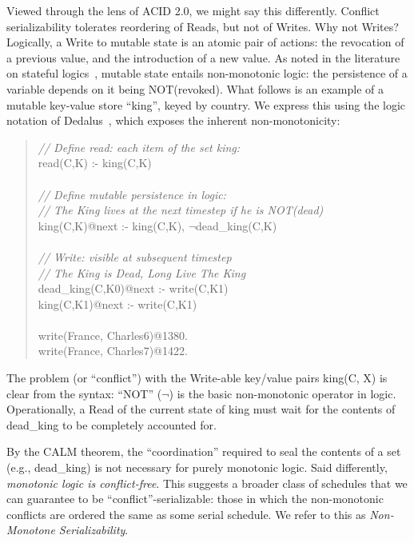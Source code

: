 \documentclass{sig-alternate}
\begin{document}
Viewed through the lens of ACID 2.0, we might say this differently.  Conflict serializability tolerates reordering of Reads, but not of Writes.  Why not Writes?  Logically, a Write to mutable state is an atomic pair of actions: the revocation of a previous value, and the introduction of a new value.   As noted in the literature on stateful logics~\cite{statelog,dedalus}, mutable state entails non-monotonic logic: the persistence of a variable depends on it being NOT(revoked).  What follows is an example of a mutable key-value store ``king'', keyed by country.  We express this using the logic notation of Dedalus~\cite{dedalus}, which exposes the inherent non-monotonicity:
\begin{quote}
	\emph{// Define read: each item of the set king: }\\
	read(C,K) :- king(C,K)\\
	\\
	\emph{// Define mutable persistence in logic:}\\
	\emph{// The King lives at the next timestep if he is NOT(dead)}\\
	king(C,K)@next :- king(C,K), $\neg$dead\_king(C,K)\\
	\\
	\emph{// Write: visible at subsequent timestep}\\
	\emph{// The King is Dead, Long Live The King}\\
	dead\_king(C,K0)@next :- write(C,K1)\\
	king(C,K1)@next :- write(C,K1)\\
	\\
	write(France, Charles6)@1380.\\
	write(France, Charles7)@1422.
\end{quote}
The problem (or ``conflict'') with the Write-able key/value pairs king(C, X) is clear from the syntax: ``NOT'' ($\neg$) is the basic non-monotonic operator in logic.  Operationally, a Read of the current state of king must wait for the contents of dead\_king to be completely accounted for.

By the CALM theorem, the ``coordination'' required to seal the contents of a set (e.g., dead\_king) is not necessary for purely monotonic logic.  Said differently, \emph{monotonic logic is conflict-free}.  This suggests a broader class of schedules that we can guarantee to be ``conflict''-serializable: those in which the non-monotonic conflicts are ordered the same as some serial schedule.  We refer to this as \emph{Non-Monotone Serializability}.
\end{document}

